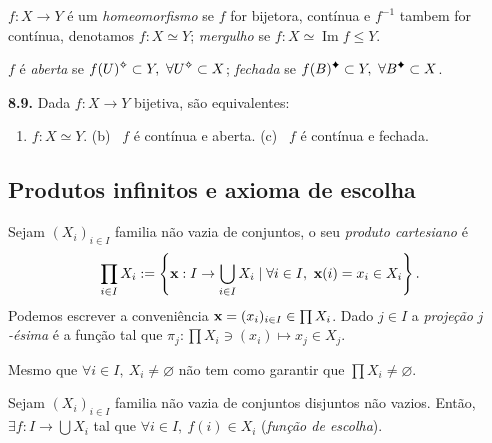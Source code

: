 
\begin{definition}
    \(f: X \to Y\) é um \emph{homeomorfismo} se \(f\) for bijetora, contínua e \(f^{-1}\) tambem for contínua, denotamos \(f: X \simeq Y\); \emph{mergulho} se \(f: X \simeq \operatorname{Im}f\leq Y\).    
\end{definition}

\begin{definition}
    \(f\) é \emph{aberta} se \(f(U)\ab\subset Y, \ \forall U\ab\subset X\); \emph{fechada} se \(f(B)\ce\subset Y, \ \forall B\ce\subset X\). 
\end{definition}

\hypertarget{prop89}{}
\begin{proposition}
    \textbf{8.9.} Dada \(f: X \to Y\) bijetiva, são equivalentes: 
    \vspace{-0.3cm}
    \begin{enumerate}[label = (\alph*), left = 0.6cm]
        \item \(f:X \simeq Y\). \hfill (b) \ \(f\) é contínua e aberta. \hfill (c) \ \(f\) é contínua e fechada. 
    \end{enumerate}
\end{proposition}

\subsection*{Produtos infinitos e axioma de escolha}

\begin{definition}
    Sejam \((X_i)_{i\in I}\) familia não vazia de conjuntos, o seu \emph{produto cartesiano} é 
    \[\prod_{i\in I}X_i := \left\{\textbf{x} : I \to \bigcup_{i\in I} X_i \mid \forall i \in I, \ \textbf{x}(i) = x_i \in X_i\right\}.\]
    Podemos escrever a conveniência \(\textbf{x} = (x_i)_{i\in I} \in \prod X_i\). Dado \(j \in I\) a \emph{projeção} \(j\)\emph{-ésima} é a função tal que \(\pi_j : \prod X_i \ni (x_i) \mapsto x_j \in X_j\). 
\end{definition}

\begin{note}
    Mesmo que \(\forall i \in I, \ X_i\neq \varnothing\) não tem como garantir que \(\prod X_i \neq \varnothing\).
\end{note}

\begin{definition}
    Sejam \((X_i)_{i\in I}\) familia não vazia de conjuntos disjuntos não vazios. Então, \(\exists f: I \to \bigcup X_i\) tal que \(\forall i \in I, \ f(i) \in X_i\) (\emph{função de escolha}).
\end{definition}

